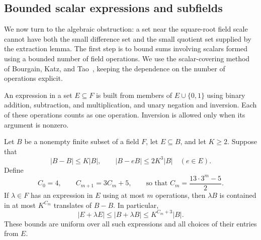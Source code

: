 \subsection{Bounded scalar expressions and subfields}

We now turn to the algebraic obstruction: a set near the square-root
field scale cannot have both the small difference set and the small
quotient set supplied by the extraction lemma. The first step is to
bound sums involving scalars formed using a bounded number of field
operations. We use the scalar-covering method of Bourgain, Katz, and
Tao~\cite[Lemma 3.2 and Proposition 3.3]{BKT2004}, keeping the dependence
on the number of operations explicit.

An expression in a set $E\subseteq F$ is built from members of
$E\cup\{0,1\}$ using binary addition, subtraction, and multiplication,
and unary negation and inversion. Each of these operations counts
as one operation. Inversion is allowed only when its argument is
nonzero.

\begin{lemma}\label{inc-scalar-coverings}
Let $B$ be a nonempty finite subset of a field $F$, let $E\subseteq B$,
and let $K\ge2$. Suppose that
\begin{equation}\label{eq:inc-scalar-hypotheses}
 |B-B|\le K|B|,
 \qquad |B-eB|\le 2K^3|B|\quad(e\in E).
\end{equation}
Define
\begin{equation}\label{eq:inc-scalar-exponents}
 C_0=4,\qquad C_{m+1}=3C_m+5,
 \qquad\text{so that }C_m=\frac{13\cdot3^m-5}{2}.
\end{equation}
If $\lambda\in F$ has an expression in $E$ using at most $m$
operations, then $\lambda B$ is contained in at most $K^{C_m}$
translates of $B-B$. In particular,
\begin{equation}\label{eq:inc-scalar-sum-bound}
 |E+\lambda E|\le |B+\lambda B|
 \le K^{C_m+3}|B|.
\end{equation}
These bounds are uniform over all such expressions and all choices
of their entries from $E$.
\end{lemma}

